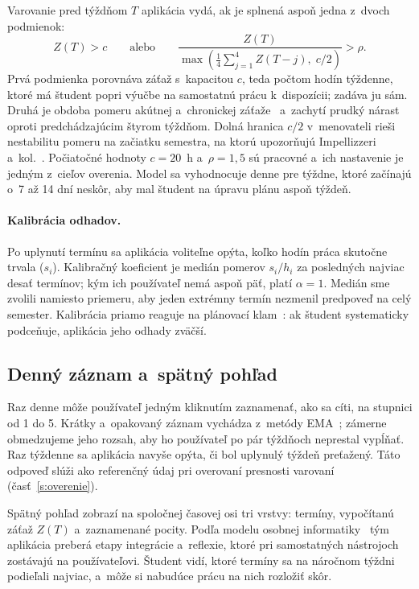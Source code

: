\documentclass[10pt,twoside,slovak,a4paper]{article}
\begin{document}
Varovanie pred týždňom $T$ aplikácia vydá, ak je splnená aspoň jedna z~dvoch
podmienok:
\begin{equation}
Z(T) > c \qquad \text{alebo} \qquad
\frac{Z(T)}{\max\!\left(\frac{1}{4}\sum_{j=1}^{4} Z(T-j),\; c/2\right)} > \rho .
\label{e:varovanie}
\end{equation}
Prvá podmienka porovnáva záťaž s~kapacitou $c$, teda počtom hodín týždenne,
ktoré má študent popri výučbe na samostatnú prácu k~dispozícii; zadáva ju
sám. Druhá je obdoba pomeru akútnej a~chronickej záťaže~\cite{Gabbett:ACWR}
a~zachytí prudký nárast oproti predchádzajúcim štyrom týždňom. Dolná hranica
$c/2$ v~menovateli rieši nestabilitu pomeru na začiatku semestra, na ktorú
upozorňujú Impellizzeri a~kol.~\cite{Impellizzeri:ACWR}. Počiatočné hodnoty
$c = 20$~h a~$\rho = 1{,}5$ sú pracovné a~ich nastavenie je jedným z~cieľov
overenia. Model sa vyhodnocuje denne pre týždne, ktoré začínajú o~7 až 14
dní neskôr, aby mal študent na úpravu plánu aspoň týždeň.

\paragraph{Kalibrácia odhadov.}
Po uplynutí termínu sa aplikácia voliteľne opýta, koľko hodín práca
skutočne trvala ($s_i$). Kalibračný koeficient je medián pomerov
$s_i / h_i$ za posledných najviac desať termínov; kým ich používateľ
nemá aspoň päť, platí $\alpha = 1$. Medián sme zvolili namiesto priemeru,
aby jeden extrémny termín nezmenil predpoveď na celý semester. Kalibrácia
priamo reaguje na plánovací klam~\cite{Buehler:Planning}: ak študent
systematicky podceňuje, aplikácia jeho odhady zväčší.

\subsection{Denný záznam a~spätný pohľad}

Raz denne môže používateľ jedným kliknutím zaznamenať, ako sa cíti, na
stupnici od 1 do 5. Krátky a~opakovaný záznam vychádza z~metódy
EMA~\cite{Shiffman:EMA}; zámerne obmedzujeme jeho rozsah, aby ho používateľ
po pár týždňoch neprestal vypĺňať. Raz týždenne sa aplikácia navyše opýta,
či bol uplynulý týždeň preťažený. Táto odpoveď slúži ako referenčný údaj pri
overovaní presnosti varovaní (časť~\ref{s:overenie}).

Spätný pohľad zobrazí na spoločnej časovej osi tri vrstvy: termíny,
vypočítanú záťaž $Z(T)$ a~zaznamenané pocity. Podľa modelu osobnej
informatiky~\cite{Li:PersonalInformatics} tým aplikácia preberá etapy
integrácie a~reflexie, ktoré pri samostatných nástrojoch zostávajú na
používateľovi. Študent vidí, ktoré termíny sa na náročnom týždni podieľali
najviac, a~môže si nabudúce prácu na nich rozložiť skôr.
\end{document}
